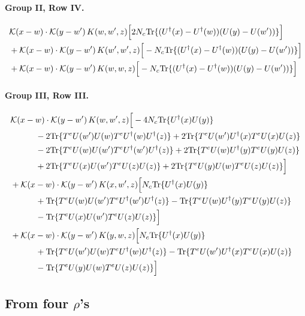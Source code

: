 \documentclass[10pt]{article}
\numberwithin{equation}{section}
\begin{document}
\paragraph{Group II, Row IV.}

\begin{align}
&\mathcal K(x-w)\cdot\mathcal K(y-w')\,K(w,w',z)\Big[2 N_c{\rm Tr}\{(U^\dagger(x)-U^\dagger(w))(U(y)-U(w'))\}\Big]\notag\\
&+\mathcal K(x-w)\cdot\mathcal K(y-w')\,K(w',w',z)\Big[-N_c{\rm Tr}\{(U^\dagger(x)-U^\dagger(w))(U(y)-U(w'))\}\Big]\notag\\
&+\mathcal K(x-w)\cdot\mathcal K(y-w')\,K(w,w,z)\Big[-N_c{\rm Tr}\{(U^\dagger(x)-U^\dagger(w))(U(y)-U(w'))\}\Big]
\label{eq:list3}
\end{align}

\paragraph{Group III, Row III.}

\begin{align}
&\mathcal K(x-w)\cdot\mathcal K(y-w')\,K(w,w',z)\Big[-4 N_c{\rm Tr}\{U^\dagger(x)U(y)\}\notag\\
&\quad\quad\quad-2{\rm Tr}\{T^eU(w')U(w)T^eU^\dagger(w)U^\dagger(z)\}+2{\rm Tr}\{T^eU(w')U^\dagger(x)T^eU(x)U(z)\}\notag\\
&\quad\quad\quad-2{\rm Tr}\{T^eU(w)U(w')T^eU^\dagger(w')U^\dagger(z)\}+2{\rm Tr}\{T^eU(w)U^\dagger(y)T^eU(y)U(z)\}\notag\\
&\quad\quad\quad+2{\rm Tr}\{T^eU(x)U(w')T^eU(z)U(z)\}+2{\rm Tr}\{T^eU(y)U(w)T^eU(z)U(z)\}\Big]\notag\\
&+\mathcal K(x-w)\cdot\mathcal K(y-w')\,K(x,w',z)\Big[N_c{\rm Tr}\{U^\dagger(x)U(y)\}\notag\\
&\quad\quad\quad+{\rm Tr}\{T^eU(w)U(w')T^eU^\dagger(w')U^\dagger(z)\}-{\rm Tr}\{T^eU(w)U^\dagger(y)T^eU(y)U(z)\}\notag\\
&\quad\quad\quad-{\rm Tr}\{T^eU(x)U(w')T^eU(z)U(z)\}\Big]\notag\\
&+\mathcal K(x-w)\cdot\mathcal K(y-w')\,K(y,w,z)\Big[N_c{\rm Tr}\{U^\dagger(x)U(y)\}\notag\\
&\quad\quad\quad+{\rm Tr}\{T^eU(w')U(w)T^eU^\dagger(w)U^\dagger(z)\}-{\rm Tr}\{T^eU(w')U^\dagger(x)T^eU(x)U(z)\}\notag\\
&\quad\quad\quad-{\rm Tr}\{T^eU(y)U(w)T^eU(z)U(z)\}\Big]
\label{eq:list4}
\end{align}

\subsection{\texorpdfstring{From four $\rho$'s}{From four rho's}}
\end{document}

